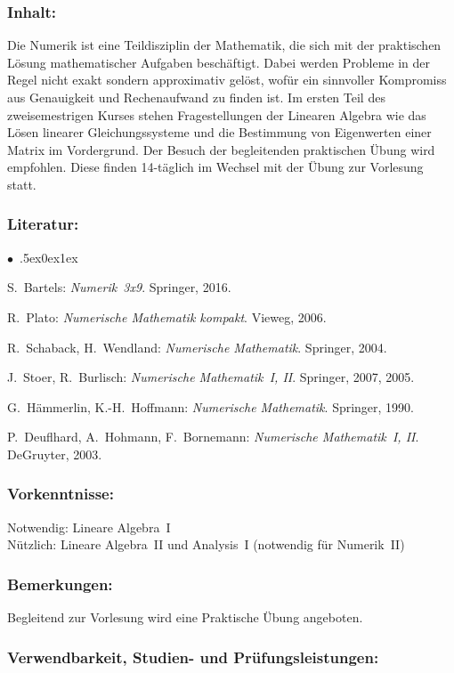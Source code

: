 \documentclass[a4paper,10pt]{article}
\renewenvironment{itemize}{\begin{list}{$\bullet$\ }{\itemsep.5ex\setlength{\topsep}{0.5\itemsep}\parsep0ex\labelsep1ex\settowidth{\labelwidth}{$\bullet$\ }\setlength{\leftmargin}{\labelwidth}\addtolength{\leftmargin}{3ex}\addtolength{\leftmargin}{\labelsep}}}{\end{list}}
\begin{document}
\subsubsection*{\large
    Inhalt:
}
Die Numerik ist eine Teildisziplin der Mathematik, die sich mit der praktischen Lösung mathematischer Aufgaben beschäftigt. Dabei werden Probleme in der Regel nicht exakt sondern approximativ gelöst, wofür ein sinnvoller Kompromiss aus Genauigkeit und Rechenaufwand zu finden ist. Im ersten Teil des zweisemestrigen Kurses stehen Fragestellungen der Linearen Algebra wie das Lösen linearer Gleichungssysteme und die Bestimmung von Eigenwerten einer Matrix im Vordergrund. Der Besuch der begleitenden praktischen Übung wird empfohlen. Diese finden 14-täglich im Wechsel mit der Übung zur Vorlesung statt.
\subsubsection*{\large
    Literatur:
}
\begin{itemize}
\item
S.~Bartels: \emph{Numerik~3x9}. Springer, 2016.
\item
R.~Plato: \emph{Numerische Mathematik kompakt}. Vieweg, 2006.
\item
R.~Schaback, H.~Wendland: \emph{Numerische Mathematik}. Springer, 2004.
\item
J.~Stoer, R.~Burlisch: \emph{Numerische Mathematik~I, II}. Springer, 2007, 2005.
\item
G.~Hämmerlin, K.-H.~Hoffmann: \emph{Numerische Mathematik}. Springer, 1990.
\item
P.~Deuflhard, A.~Hohmann, F.~Bornemann: \emph{Numerische Mathematik~I, II}. DeGruyter, 2003.
\end{itemize}
\subsubsection*{\large
    Vorkenntnisse:
}
Notwendig: Lineare Algebra~I \\
Nützlich: Lineare Algebra~II und Analysis~I (notwendig für Numerik~II)
\subsubsection*{\large
    Bemerkungen:
}
Begleitend zur Vorlesung wird eine Praktische Übung angeboten.
\cleardoublepage
\subsubsection*{\large
    Verwendbarkeit, Studien- und Prüfungsleistungen:
}
\end{document}
